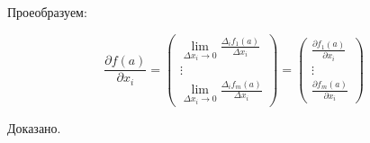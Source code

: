 Проеобразуем:

\[\frac{\partial f(a)}{\partial x_{i}}=\left(\begin{array}{c}
\lim _{\Delta x_{i} \rightarrow 0} \frac{\Delta_{i} f_{1}(a)}{\Delta x_{i}} \\
\vdots \\
\lim _{\Delta x_{i} \rightarrow 0} \frac{\Delta_{i} f_{m}(a)}{\Delta x_{i}}
\end{array}\right)=\left(\begin{array}{c}
\frac{\partial f_{1}(a)}{\partial x_{i}} \\
\vdots \\
\frac{\partial f_{m}(a)}{\partial x_{i}}
\end{array}\right)\]

Доказано.
